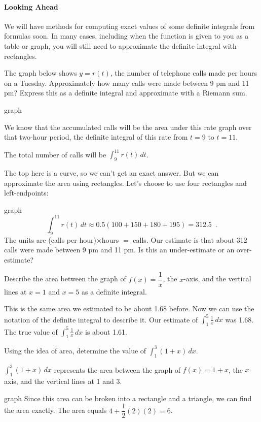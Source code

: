 \begin{definition}
\paragraph{Looking Ahead}
We will have methods for computing exact values of some definite integrals from formulas soon. In many cases, including when the function is given to you as a table or graph, you will still need to approximate the definite integral with rectangles.
\end{definition}
\begin{example}
The graph below shows $y=r(t)$, the number of telephone calls made per hours on a Tuesday. Approximately how many calls were made between 9 pm and 11 pm? Express this as a definite integral and approximate with a Riemann sum.

graph
\begin{solution}
We know that the accumulated calls will be the area under this rate graph over that two-hour period, the definite integral of this rate from $t=9$ to $t=11$.

The total number of calls will be $\int_9^{11}r(t)\,dt$.

The top here is a curve, so we can’t get an exact answer. But we can approximate the area using rectangles. Let's choose to use four rectangles and left-endpoints:

graph
$$\int_9^{11}r(t)\,dt\approx   0.5(100+150+180+195)=312.5 \enspace .$$
The units are (calls per hour)$\times$hours $=$ calls. Our estimate is that about 312 calls were made between 9 pm and 11 pm. Is this an under-estimate or an over-estimate?
\end{solution}\end{example}

\begin{example}
Describe the area between the graph of $f(x)=\dfrac{1}{x}$, the $x$-axis, and the vertical lines at $x=1$ and $x=5$ as a definite integral.

\begin{solution}
This is the same area we estimated to be about 1.68 before. Now we can use the notation of the definite integral to describe it. Our estimate of $\int_1^5\frac{1}{x}\,dx$ was 1.68. The true value of $\int_1^5\frac{1}{x}\,dx$ is about 1.61.
\end{solution}\end{example}

\begin{example}
Using the idea of area, determine the value of $\int_1^3(1+x)\,dx$.

\begin{solution}
  $\int_1^3(1+x)\,dx$ represents the area between the graph of $f(x)=1+x$, the $x$-axis, and the vertical lines at 1 and 3.

graph
Since this area can be broken into a rectangle and a triangle, we can find the area exactly. The area equals
$4+\dfrac{1}{2}(2)(2)=6$.
\end{solution}\end{example}

